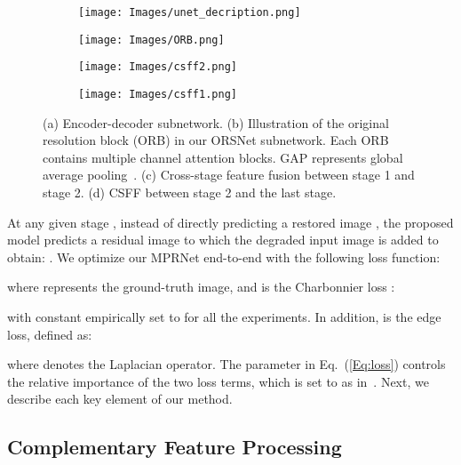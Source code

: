 \documentclass[10pt,twocolumn,letterpaper]{article}
\begin{document}
\begin{figure*}[!t]
\centering
    \begin{subfigure}[t]{0.3\textwidth}
      \texttt{[image: Images/unet\_decription.png]}
      \caption{\small}
      \label{fig:unet}
    \end{subfigure}
    \begin{subfigure}[t]{0.35\textwidth}
      \texttt{[image: Images/ORB.png]}
      \caption{\small }
      \label{fig:orb}
    \end{subfigure}
    \begin{subfigure}[t]{0.155\textwidth}
      \texttt{[image: Images/csff2.png]}
      \caption{\small }
      \label{fig:csff unets}
    \end{subfigure}
    \begin{subfigure}[t]{0.155\textwidth}
      \texttt{[image: Images/csff1.png]}
      \caption{\small}
      \label{fig:csff orsnet}
    \end{subfigure}
\vspace{-3mm}
\caption{\small (a) Encoder-decoder subnetwork. (b) Illustration of the original resolution block (ORB) in our ORSNet subnetwork. Each ORB contains multiple channel attention blocks. GAP represents global average pooling~\cite{liu2015gap}. (c) Cross-stage feature fusion between stage 1 and stage 2. (d) CSFF between stage 2 and the last stage. }
\vspace{-1.5em}
\end{figure*}

At any given stage , instead of directly predicting a restored image , the proposed model predicts a residual image  to which the degraded input image  is added to obtain: .
We optimize our MPRNet end-to-end with the following loss function:

where  represents the ground-truth image, and   is the Charbonnier loss \cite{charbonnier1994}: 

with constant  empirically set to  for all the experiments. 
In addition,  is the edge loss, defined as: 

where  denotes the Laplacian operator. The parameter  in Eq.~(\ref{Eq:loss}) controls the relative importance of the two loss terms, which is set to  as in~\cite{mspfn2020}. 
Next, we describe each key element of our method. 

\subsection{Complementary Feature Processing}
\end{document}
